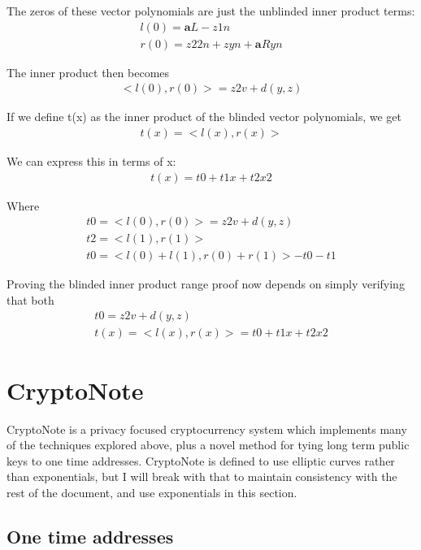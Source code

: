 \documentclass{article}
\begin{document}
The zeros of these vector polynomials are just the unblinded inner product terms:
\begin{eqnarray}
  l(0) = \textbf{a}L - z 1n\\
  r(0) = z2 2n + z yn + \textbf{a}Ryn
\end{eqnarray}

The inner product then becomes
\begin{eqnarray}
  <l(0), r(0)> = z2 v + d(y,z)
\end{eqnarray}

If we define t(x) as the inner product of the blinded vector polynomials, we get
\begin{eqnarray}
  t(x) = <l(x), r(x)> 
\end{eqnarray}

We can express this in terms of x:
\begin{eqnarray}
  t(x) = t0 + t1 x + t2 x2
\end{eqnarray}

Where
\begin{eqnarray}
  t0 = <l(0), r(0)> = z2 v + d(y,z)\\
  t2 = <l(1), r(1)>\\
  t0 = <l(0) + l(1), r(0) + r(1)> - t0 - t1
\end{eqnarray}

Proving the blinded inner product range proof now depends on simply verifying that both 
\begin{eqnarray}
  t0 = z2 v + d(y,z)\\
  t(x) = <l(x), r(x)> = t0 + t1 x + t2 x2
\end{eqnarray}



\section{CryptoNote}

CryptoNote is a privacy focused cryptocurrency system which implements many of the techniques explored above, plus a novel method for tying long term public keys to one time addresses.  CryptoNote is defined to use elliptic curves rather than exponentials, but I will break with that to maintain consistency with the rest of the document, and use exponentials in this section.


\subsection{One time addresses}
\end{document}

